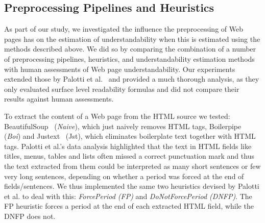 \subsection{Preprocessing Pipelines and Heuristics}
\label{sec:pipelines}

As part of our study, we investigated the influence the preprocessing of Web pages has on the estimation of understandability when this is estimated using the methods described above.
We did so by comparing the combination of a number of preprocessing pipelines, heuristics, and understandability estimation methods with human assessments of Web page understandability. 
Our experiments extended those by Palotti et al.~\cite{palotti15} and provided a much thorough analysis, as they only evaluated surface level readability formulas and did not compare their results against human assessments. 

To extract the content of a Web page from the HTML source we tested: BeautifulSoup~\cite{bs4} (\textit{Naive}), which just naively removes HTML tags, Boilerpipe~\cite{kohlschutter10} (\textit{Boi}) and Justext~\cite{jan11} ({Jst}), which eliminates boilerplate text together with HTML tags. 
Palotti et al.'s data analysis highlighted that the text in HTML fields like titles, menus, tables and lists often missed a correct punctuation mark and thus the text extracted from them could be interpreted as many short sentences or few very long sentences, depending on whether a period was forced at the end of fields/sentences. We thus implemented the same two heuristics devised by Palotti et al. to deal with this: \textit{ForcePeriod (FP)} and \textit{DoNotForcePeriod (DNFP)}. The FP heuristic forces a period at the end of each extracted HTML field, while the DNFP does not. 


